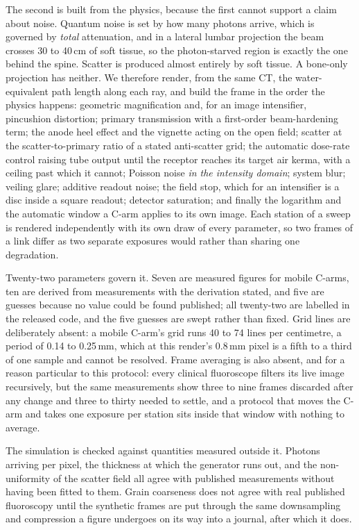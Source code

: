 \documentclass[11pt,letterpaper]{article}
\begin{document}
The second is built from the physics, because the first cannot support a claim about noise. Quantum
noise is set by how many photons arrive, which is governed by \emph{total} attenuation, and in a lateral
lumbar projection the beam crosses 30 to 40\,cm of soft tissue, so the photon-starved region is exactly
the one behind the spine. Scatter is produced almost entirely by soft tissue. A bone-only projection has
neither. We therefore render, from the same CT, the water-equivalent path length along each ray, and
build the frame in the order the physics happens: geometric magnification and, for an image intensifier,
pincushion distortion; primary transmission with a first-order beam-hardening term; the anode heel effect
and the vignette acting on the open field; scatter at the scatter-to-primary ratio of a stated
anti-scatter grid; the automatic dose-rate control raising tube output until the receptor reaches its
target air kerma, with a ceiling past which it cannot; Poisson noise \emph{in the intensity domain};
system blur; veiling glare; additive readout noise; the field stop, which for an intensifier is a disc
inside a square readout; detector saturation; and finally the logarithm and the automatic window a C-arm
applies to its own image. Each station of a sweep is rendered independently with its own draw of every
parameter, so two frames of a link differ as two separate exposures would rather than sharing one
degradation.

Twenty-two parameters govern it. Seven are measured figures for mobile C-arms, ten are derived from
measurements with the derivation stated, and five are guesses because no value could be found published;
all twenty-two are labelled in the released code, and the five guesses are swept rather than fixed. Grid
lines are deliberately absent: a mobile C-arm's grid runs 40 to 74 lines per centimetre, a period of 0.14
to 0.25\,mm, which at this render's 0.8\,mm pixel is a fifth to a third of one sample and cannot be
resolved. Frame averaging is also absent, and for a reason particular to this protocol: every clinical
fluoroscope filters its live image recursively, but the same measurements show three to nine frames
discarded after any change and three to thirty needed to settle, and a protocol that moves the C-arm and
takes one exposure per station sits inside that window with nothing to average.

The simulation is checked against quantities measured outside it. Photons arriving per pixel, the
thickness at which the generator runs out, and the non-uniformity of the scatter field all agree with
published measurements without having been fitted to them. Grain coarseness does not agree with real
published fluoroscopy until the synthetic frames are put through the same downsampling and compression a
figure undergoes on its way into a journal, after which it does.
\end{document}
